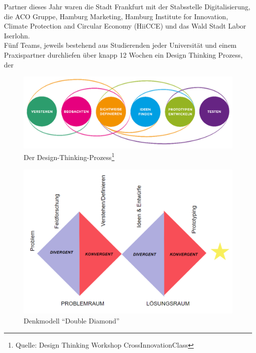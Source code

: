     Partner dieses Jahr waren die Stadt Frankfurt mit der Stabsstelle Digitalisierung, die ACO Gruppe, Hamburg Marketing, Hamburg Institute for Innovation, Climate Protection and Circular Economy (HiiCCE) und das Wald Stadt Labor Iserlohn. \\

    Fünf Teams, jeweils bestehend aus Studierenden jeder Universität und einem Praxispartner durchliefen über knapp 12 Wochen ein Design Thinking Prozess, der 

    \begin{figure}[h]
        \begin{center}
            \includegraphics[width=12cm]{media/00_introduction/design_thinking_2.png}
        \end{center}
        \caption{Der Design-Thinking-Prozess\protect\footnote{Quelle: Design Thinking Workshop CrossInnovationClass}}
        \label{fig:dt_2}
    \end{figure}

    \begin{figure}[h]
        \begin{center}
            \includegraphics[width=12cm]{media/00_introduction/design_thinking_1.png}
        \end{center}
        \caption{Denkmodell \enquote{Double Diamond}\protect\footnotemark[\value{footnote}]}
        \label{fig:dt_1}
    \end{figure}
    

